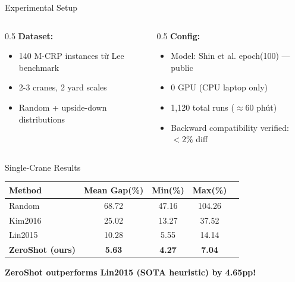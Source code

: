 \documentclass[aspectratio=169,11pt]{beamer}
\begin{document}
\begin{frame}{Experimental Setup}
\begin{columns}
\begin{column}{0.5\textwidth}
\textbf{Dataset:}
\begin{itemize}
    \item 140 M-CRP instances từ Lee benchmark
    \item 2-3 cranes, 2 yard scales
    \item Random + upside-down distributions
\end{itemize}
\end{column}
\begin{column}{0.5\textwidth}
\textbf{Config:}
\begin{itemize}
    \item Model: Shin et al. epoch(100) — public
    \item 0 GPU (CPU laptop only)
    \item 1,120 total runs ($\approx$60 phút)
    \item Backward compatibility verified: $<2\%$ diff
\end{itemize}
\end{column}
\end{columns}
\end{frame}

\begin{frame}{Single-Crane Results}
\begin{center}
\begin{tabular}{lcccc}
\toprule
Method & Mean Gap(\%) & Min(\%) & Max(\%) \\
\midrule
Random & 68.72 & 47.16 & 104.26 \\
Kim2016 & 25.02 & 13.27 & 37.52 \\
Lin2015 & 10.28 & 5.55 & 14.14 \\
\midrule
\textbf{ZeroShot (ours)} & \textbf{5.63} & \textbf{4.27} & \textbf{7.04} \\
\bottomrule
\end{tabular}
\end{center}

\vspace{0.3cm}
\centering\textbf{ZeroShot outperforms Lin2015 (SOTA heuristic) by 4.65pp!}
\end{frame}
\end{document}

